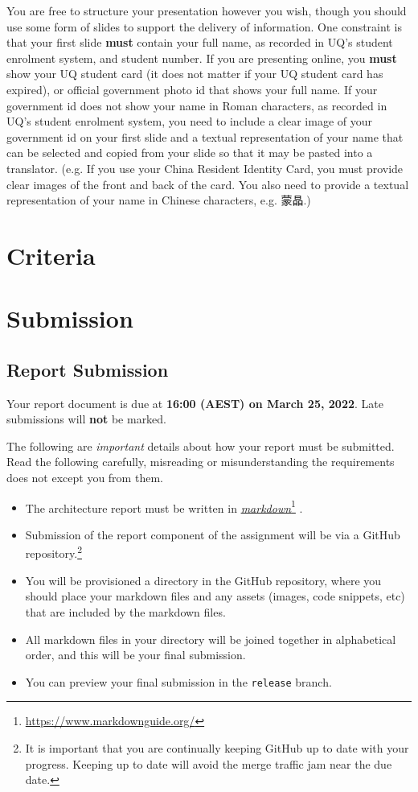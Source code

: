 \documentclass{csse4400}
\newcommand{\link}[2]{%
\href{#2}{#1}\footnote{\url{#2}}%
}
\begin{document}
\begin{CJK*}{UTF8}{gbsn}
You are free to structure your presentation however you wish, though you should use some form of slides to support the delivery of information.
One constraint is that your first slide \textbf{must} contain your full name, as recorded in UQ's student enrolment system, and student number.
If you are presenting online, you \textbf{must} show your UQ student card (it does not matter if your UQ student card has expired),
or official government photo id that shows your full name. If your government id does not show your name in Roman characters,
as recorded in UQ's student enrolment system, you need to include a clear image of your government id on your first slide and a textual
representation of your name that can be selected and copied from your slide so that it may be pasted into a translator.
(e.g. If you use your China Resident Identity Card, you must provide clear images of the front and back
of the card. You also need to provide a textual representation of your name in Chinese characters, e.g. 蒙晶.)
\end{CJK*}

\section{Criteria}

\section{Submission}
\subsection{Report Submission}
Your report document is due at \textbf{16:00 (AEST) on March 25, 2022}. Late submissions will \textbf{not} be marked.

The following are \textsl{important} details about how your report must be submitted.
Read the following carefully, misreading or misunderstanding the requirements does not except you from them.

\begin{itemize}
    \item The architecture report must be written in \link{\textsl{markdown}}{https://www.markdownguide.org/}.
    \item Submission of the report component of the assignment will be via a GitHub repository.\footnote{It is important that you are continually keeping GitHub up to date with your progress.
        Keeping up to date will avoid the merge traffic jam near the due date.}
    \item You will be provisioned a directory in the GitHub repository,
        where you should place your markdown files and any assets (images, code snippets, etc) that are included by the markdown files.
    \item All markdown files in your directory will be joined together in alphabetical order,
        and this will be your final submission.
    \item You can preview your final submission in the \texttt{release} branch.
\end{itemize}
\end{document}
